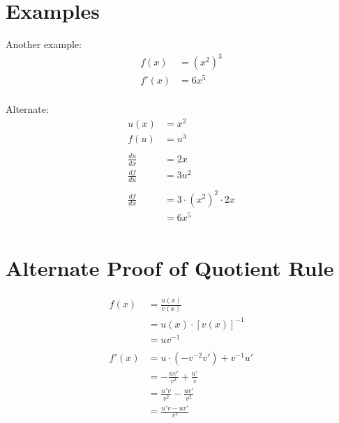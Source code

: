 \documentclass[letterpaper, landscape]{exam}
\begin{document}
  \section{Examples}

  Another example:
  \begin{align*}
    f(x)  & = \left( x^2 \right)^3 \\
    f'(x) & = 6x^5 \\
  \end{align*}

  Alternate:
  \begin{align*}
    u(x)          & = x^2 \\
    f(u)          & = u^3 \\
    \\
    \frac{du}{dx} & = 2x \\
    \frac{df}{du} & = 3u^2 \\
    \\
    \frac{df}{dx} & = 3 \cdot \left( x^2 \right)^2 \cdot 2x \\
                  & = 6x^5 \\
  \end{align*}

  \section{Alternate Proof of Quotient Rule} %
  
  \begin{align*}
    f(x)  & = \frac{u(x)}{v(x)} \\
          & = u(x) \cdot [ v(x) ]^{-1} \\
          & = uv^{-1} \\
    \\
    f'(x) & = u \cdot (- v^{-2} v') + v^{-1} u' \\
          & = - \frac{uv'}{v^2} + \frac{u'}{v} \\
          & = \frac{u'v}{v^2} - \frac{uv'}{v^2} \\
          & = \frac{u'v - uv'}{v^2} \\
  \end{align*}
\end{document}
